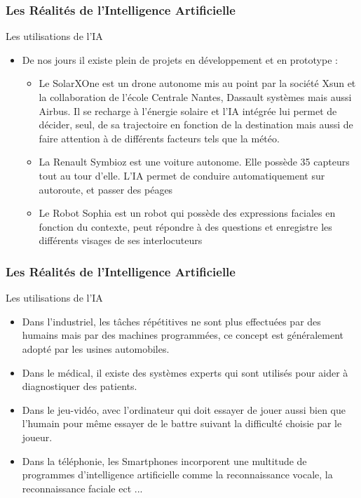 \documentclass{beamer}
\begin{document}
	\begin{frame}
	\frametitle{Les Réalités de l'Intelligence Artificielle}
	\begin{block}{Les utilisations de l'IA}
	\begin{itemize}
	\itemsep1em
		\item De nos jours il existe plein de projets en développement et en prototype :
		\begin{itemize}
		\itemsep1em
		\item Le SolarXOne est un drone autonome mis au point par la société Xsun et la collaboration de l’école Centrale Nantes, Dassault systèmes mais aussi Airbus. Il se recharge à l'énergie solaire et l'IA intégrée lui permet de décider, seul, de sa trajectoire en fonction de la destination mais aussi de faire attention à de différents facteurs tels que la météo.
		\item La Renault Symbioz est une voiture autonome. Elle possède 35 capteurs tout au tour d'elle. L'IA permet de conduire automatiquement sur autoroute, et passer des péages
		\item Le Robot Sophia est un robot qui possède des expressions faciales en fonction du contexte, peut répondre à des questions et enregistre les différents visages de ses interlocuteurs
		\end{itemize}
		\end{itemize}
	\end{block}
	\end{frame}
	
	\begin{frame}
	\frametitle{Les Réalités de l'Intelligence Artificielle}
	\begin{block}{Les utilisations de l'IA}
	\begin{itemize}
	\itemsep1em
		\item Dans l'industriel, les tâches répétitives ne sont plus effectuées par des humains mais par des machines programmées, ce concept est généralement adopté par les usines automobiles.
		\item Dans le médical, il existe des systèmes experts qui sont utilisés pour aider à diagnostiquer des patients.
		\item Dans le jeu-vidéo, avec l'ordinateur qui doit essayer de jouer aussi bien que l'humain pour même essayer de le battre suivant la difficulté choisie par le joueur.
		\item Dans la téléphonie, les Smartphones incorporent une multitude de programmes d'intelligence artificielle comme la reconnaissance vocale, la reconnaissance faciale ect ...
	\end{itemize}
	\end{block}
	\end{frame}
	
\end{document}
